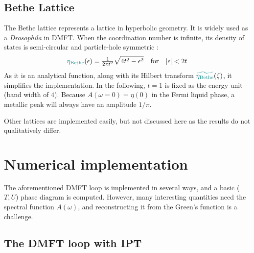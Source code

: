 \documentclass[reprint,amsmath,amssymb,aps,pra]{revtex4-2}
\begin{document}
\subsection{Bethe Lattice}

The Bethe lattice represents a lattice in hyperbolic geometry. It is widely used as a \emph{Drosophila} in DMFT. When the coordination number is infinite, its density of states is semi-circular and particle-hole symmetric :
\begin{equation}
    {\color[HTML]{008080}\eta_{\text{Bethe}}} (\epsilon)  = \tfrac{1}{2 \pi t^2}  \sqrt{4 t^2 - \epsilon^2} \quad \text{for} \quad | \epsilon | < 2 t 
\end{equation}
As it is an analytical function, along with its Hilbert transform ${\color[HTML]{008080}\widetilde{\eta_{\text{Bethe}}}} (\zeta)$, it simplifies the implementation. In the following, $t=1$ is fixed as the energy unit (band width of $4$). Because $A(\omega=0)=\eta(0)$ in the Fermi liquid phase, a metallic peak will always have an amplitude $1/\pi$.

Other lattices are implemented easily, but not discussed here as the results do not qualitatively differ.

\section{Numerical implementation}

The aforementioned DMFT loop is implemented in several ways, and a basic ($T,U$) phase diagram is computed. However, many interesting quantities need the spectral function $A(\omega)$, and reconstructing it from the Green's function is a challenge.

\subsection{The DMFT loop with IPT}
\end{document}
